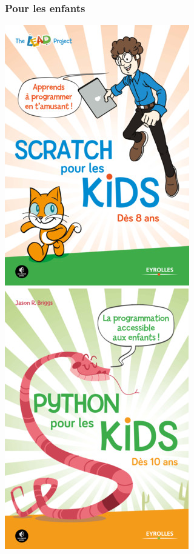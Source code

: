 \documentclass{beamer}
\begin{document}
\begin{frame}
\frametitle{Pour les enfants}
\begin{center}
\includegraphics[scale=0.5] {./images/scractch_4_kids.jpg}
\includegraphics[scale=0.5] {./images/python_4_kids.jpg}
\end{center}
\end{frame}
\end{document}
